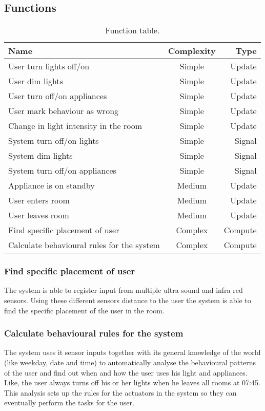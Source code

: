 \subsection{Functions}
\label{subsec:Functions}
\begin{table}[hbtp]
\centering
\begin{tabular}{lcr}
\toprule
\textbf{Name}																& \textbf{Complexity}	& \textbf{Type} \\
\midrule
User turn lights off/on				& Simple	& Update  \\
User dim lights					& Simple	& Update  \\
User turn off/on appliances			& Simple	& Update  \\
User mark behaviour as wrong			& Simple	& Update  \\
Change in light intensity in the room		& Simple	& Update  \\
System turn off/on lights			& Simple	& Signal  \\
System dim lights				& Simple	& Signal  \\
System turn off/on appliances			& Simple	& Signal  \\
Appliance is on standby				& Medium	& Update  \\
User enters room				& Medium	& Update  \\
User leaves room				& Medium	& Update  \\
Find specific placement of user			& Complex	& Compute \\
Calculate behavioural rules for the system	& Complex	& Compute \\
\bottomrule
\end{tabular}
\caption{Function table.}
\label{table:functionlist}
\end{table}

\subsubsection{Find specific placement of user}
The system is able to register input from multiple ultra sound and infra red sensors. Using these different sensors distance to the user the system is able to find the specific placement of the user in the room.

\subsubsection{Calculate behavioural rules for the system}
The system uses it sensor inputs together with its general knowledge of the world (like weekday, date and time) to automatically analyse the behavioural patterns of the user and find out when and how the user uses his light and appliances. Like, the user always turns off his or her lights when he leaves all rooms at 07:45. This analysis sets up the rules for the actuators in the system so they can eventually perform the tasks for the user.
